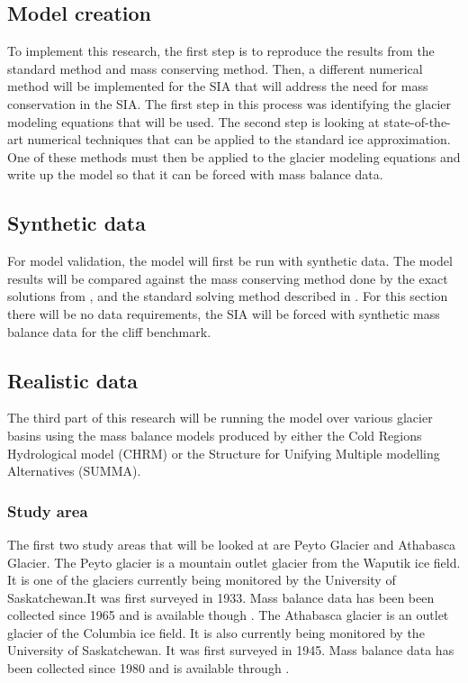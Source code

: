 \documentclass{article}
\begin{document}
\subsection{Model creation}
To implement this research, the first step is to reproduce the results from the standard method and \citet{Jarosch2013} mass conserving method. Then, a different numerical method will be implemented for the SIA that will address the need for mass conservation in the SIA. The first step in this process was identifying the glacier modeling equations that will be used. The second step is looking at state-of-the-art numerical techniques that can be applied to the standard ice approximation. One of these methods must then be applied to the glacier modeling equations and write up the model so that it can be forced with mass balance data.
\subsection{Synthetic data}
For model validation, the model will first be run with synthetic data. The model results will be compared against the mass conserving method done by \citet{Jarosch2013} the exact solutions from \citet{Bueler2005}, and the standard solving method described in \citet{Jarosch2013, Hindmarsh1996}. For this section there will be no data requirements, the SIA will be forced with synthetic mass balance data for the cliff benchmark. 
\subsection{Realistic data}
The third part of this research will be running the model over various glacier basins using the mass balance models produced by either the Cold Regions Hydrological model (CHRM) or the Structure for Unifying Multiple modelling Alternatives (SUMMA). 

\subsubsection{Study area}
The first two study areas that will be looked at are Peyto Glacier and Athabasca Glacier. The Peyto glacier is a mountain outlet glacier from the Waputik ice field. It is one of the glaciers currently being monitored by the University of Saskatchewan.It was first surveyed in 1933. Mass balance data has been been collected since 1965 and is available though \citet{WGMS2020}. The Athabasca glacier is an outlet glacier of the Columbia ice field. It is also currently being monitored by the University of Saskatchewan. It was first surveyed in 1945. Mass balance data has been collected since 1980 and is available through \citet{WGMS2020}.
\end{document}
